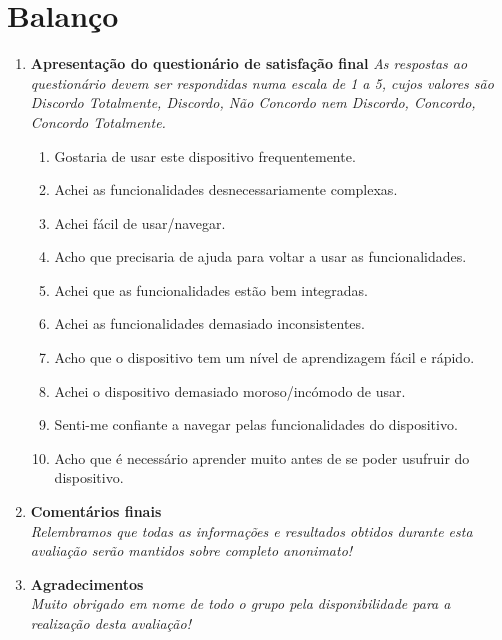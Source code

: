\documentclass[12pt]{article}
\begin{document}
\section*{Balanço}
    \begin{enumerate}
        \item \textbf{Apresentação do questionário de satisfação final}
            \textit{As respostas ao questionário devem ser respondidas numa escala de 1 a 5, cujos valores são Discordo Totalmente, Discordo, Não Concordo nem Discordo, Concordo, Concordo Totalmente.}
             \begin{enumerate}[label=\arabic*)]
                \item Gostaria de usar este dispositivo frequentemente.
                \item Achei as funcionalidades desnecessariamente complexas.
                \item Achei fácil de usar/navegar.
                \item Acho que precisaria de ajuda para voltar a usar as funcionalidades.
                \item Achei que as funcionalidades estão bem integradas.
                \item Achei as funcionalidades demasiado inconsistentes.
                \item Acho que o dispositivo tem um nível de aprendizagem fácil e rápido.
                \item Achei o dispositivo demasiado moroso/incómodo de usar.
                \item Senti-me confiante a navegar pelas funcionalidades do dispositivo.
                \item Acho que é necessário aprender muito antes de se poder usufruir do dispositivo.
            \end{enumerate}
        
        \item \textbf{Comentários finais}\\
        \textit{Relembramos que todas as informações e resultados obtidos durante esta avaliação serão mantidos sobre completo anonimato!}
        
        \item \textbf{Agradecimentos}\\
        \textit{Muito obrigado em nome de todo o grupo pela disponibilidade para a realização desta avaliação!}
    \end{enumerate}
\end{document}
